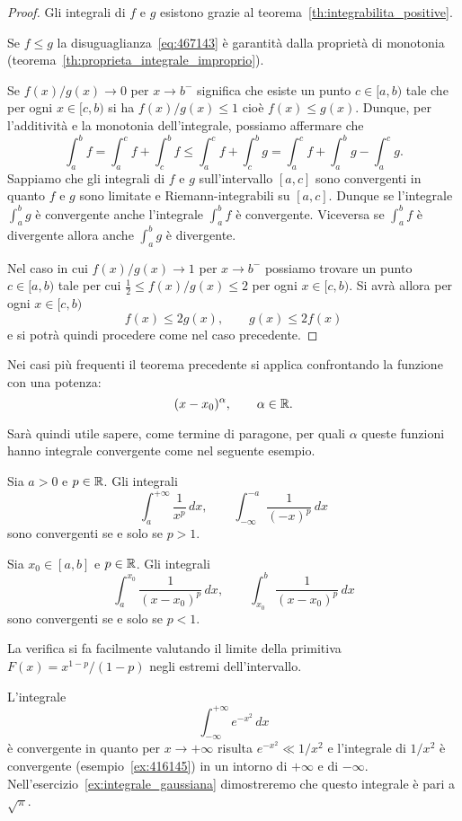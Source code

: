 \begin{proof}
\mymark{**}
Gli integrali di $f$ e $g$ esistono grazie al teorema~\ref{th:integrabilita_positive}.

Se $f\le g$ la disuguaglianza~\eqref{eq:467143} è garantità dalla proprietà di monotonia
(teorema~\ref{th:proprieta_integrale_improprio}).

Se $f(x)/g(x) \to 0$ per $x\to b^-$ significa che esiste un punto $c\in[a,b)$
tale che per ogni $x\in [c,b)$ si ha $f(x)/g(x)\le 1$ cioè $f(x)\le g(x)$.
Dunque, per l'additività e la monotonia dell'integrale, possiamo affermare che
\[
  \int_a^b f
  = \int_a^c f + \int_c^b f
  \le \int_a^c f + \int_c^b g
  = \int_a^c f + \int_a^b g - \int_a^c g.
\]
Sappiamo che gli integrali di $f$ e $g$ sull'intervallo
$[a,c]$ sono convergenti in quanto $f$ e $g$ sono
limitate e Riemann-integrabili su $[a,c]$.
Dunque se l'integrale $\int_a^b g$ è convergente anche l'integrale
$\int_a^b f$ è convergente.
Viceversa se $\int_a^b f$ è divergente allora anche $\int_a^b g$ è divergente.

Nel caso in cui $f(x)/g(x)\to 1$ per $x\to b^-$ possiamo trovare
un punto $c\in[a,b)$ tale per cui $\frac 1 2 \le f(x)/g(x) \le 2$
per ogni $x\in [c,b)$. Si avrà allora per ogni $x\in [c,b)$
\[
f(x) \le 2g(x), \qquad g(x) \le 2 f(x)
\]
e si potrà quindi procedere come nel caso precedente.
\end{proof}

Nei casi più frequenti il teorema precedente si applica confrontando la funzione con una potenza:
\[
  (x-x_0)^\alpha, \qquad \alpha \in {\mathbb R}.
\]

Sarà quindi utile sapere, come termine di paragone,
per quali $\alpha$ queste funzioni hanno integrale convergente
come nel seguente esempio.

\begin{example}
\label{ex:416145}%
\mymark{***}%
Sia $a>0$ e $p\in {\mathbb R}$. Gli integrali
\[
  \int_{a}^{+\infty}\frac{1}{x^p}\, dx,
  \qquad
  \int_{-\infty}^{-a}\frac{1}{(-x)^p}\, dx
\]
sono convergenti se e solo se $p>1$.

Sia $x_0\in [a,b]$ e $p\in{\mathbb R}$.
Gli integrali
\[
  \int_a^{x_0} \frac{1}{(x-x_0)^p}\, dx,
  \qquad
  \int_{x_0}^b \frac{1}{(x-x_0)^p}\, dx
\]
sono convergenti se e solo se $p<1$.

La verifica si fa facilmente valutando il limite della primitiva
$F(x) = x^{1-p}/(1-p)$ negli estremi dell'intervallo.
\end{example}

\begin{example}
\label{ex:integrale_gaussiana_finito}%
%
%
%
L'integrale
\[
 \int_{-\infty}^{+\infty}e^{-x^2}\, dx
\]
è convergente in quanto per $x\to +\infty$ risulta $e^{-x^2} \ll 1/x^2$
e l'integrale di $1/x^2$ è convergente (esempio~\ref{ex:416145})
in un intorno di $+\infty$ e di $-\infty$.
Nell'esercizio~\ref{ex:integrale_gaussiana} dimostreremo 
che questo integrale è pari a $\sqrt \pi$.
\end{example}

